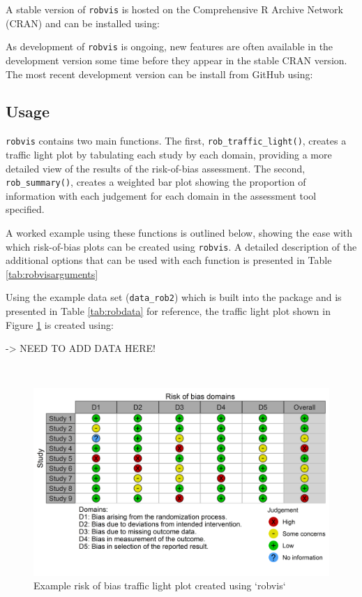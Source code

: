 \documentclass[a4paper, twoside]{templates/ociamthesis}
\begin{document}
A stable version of \texttt{robvis} is hosted on the Comprehensive R Archive Network (CRAN) and can be installed using:

As development of \texttt{robvis} is ongoing, new features are often available in the development version some time before they appear in the stable CRAN version. The most recent development version can be install from GitHub using:

\hypertarget{usage-1}{%
\subsection{Usage}\label{usage-1}}

\texttt{robvis} contains two main functions. The first, \texttt{rob\_traffic\_light()}, creates a traffic light plot by tabulating each study by each domain, providing a more detailed view of the results of the risk-of-bias assessment. The second, \texttt{rob\_summary()}, creates a weighted bar plot showing the proportion of information with each judgement for each domain in the assessment tool specified.

A worked example using these functions is outlined below, showing the ease with which risk-of-bias plots can be created using \texttt{robvis}. A detailed description of the additional options that can be used with each function is presented in Table \ref{tab:robvisarguments}

Using the example data set (\texttt{data\_rob2}) which is built into the package and is presented in Table \ref{tab:robdata} for reference, the traffic light plot shown in Figure \ref{fig:trafficplot} is created using:

-\textgreater{} NEED TO ADD DATA HERE!

~

\begin{figure}
\includegraphics[width=1\linewidth]{figures/sys-rev-tools/example-rob-traffic-light-plot} \caption{Example risk of bias traffic light plot created using `robvis`}\label{fig:trafficplot}
\end{figure}
\end{document}
